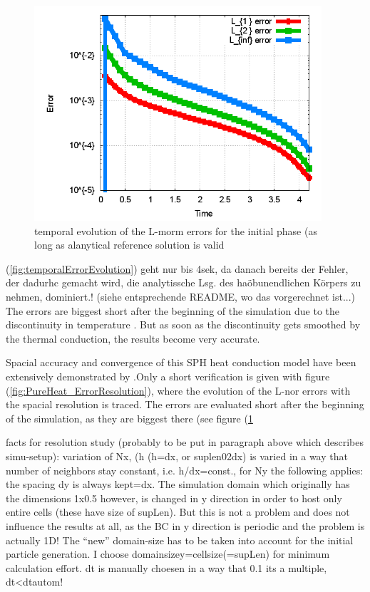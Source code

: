 \documentclass{report}
\begin{document}
\begin{figure}[h]  
  \label{fig:PureHeat_temporalErrorEvolution}
  \centering
  \includegraphics[width=0.95\textwidth]{Graphics/results/PureHeatConduction/temporalErrEvolution}
  \caption{temporal evolution of the L-morm errors for the initial phase (as long as alanytical reference solution is valid}
\end{figure}

(\ref{fig:temporalErrorEvolution}) geht nur bis 4sek, da danach bereits der Fehler, der dadurhc gemacht wird, die analytissche Lsg. des haöbunendlichen Körpers zu nehmen, dominiert.! (siehe entsprechende README, wo das vorgerechnet ist...)
The errors are biggest short after the beginning of the simulation due to the discontinuity in temperature \cite{Cleary1999}. But as soon as the discontinuity gets smoothed by the thermal conduction, the results become very accurate.

Spacial accuracy and convergence of this SPH heat conduction model have been extensively demonstrated by \cite{Cleary1999}.Only a short verification is given with figure (\ref{fig:PureHeat_ErrorResolution}), where the evolution of the L-nor errors with the spacial resolution is traced. The errors are evaluated short after the beginning of the simulation, as they are biggest there (see figure (\ref{fig:PureHeat_temporalErrorEvolution} 

facts for resolution study (probably to be put in paragraph above which describes simu-setup): variation of Nx, (h (h=dx, or suplen02dx) is varied in a way that number of neighbors stay constant, i.e. h/dx=const., 
for Ny the following applies: the spacing dy is always kept=dx. The simulation domain which originally has the dimensions 1x0.5 however, is changed in y direction in order to host only entire cells (these have size of supLen).
But this is not a problem and does not influence the results at all, as the BC in y direction is periodic and the problem is actually 1D!
The ``new'' domain-size has to be taken into account for the initial particle generation. I choose domainsizey=cellsize(=supLen) for minimum calculation effort.
dt is manually choesen in a way that 0.1 its a multiple, dt<dtautom!
\end{document}
